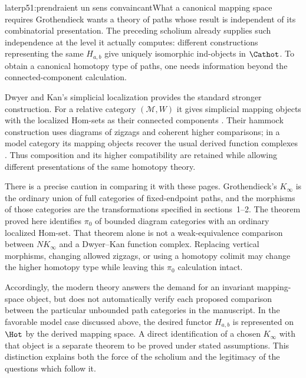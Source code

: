 \begin{dcomment}{later}{p51:prendraient un sens convaincant}{What a canonical mapping space requires}
Grothendieck wants a theory of paths whose result is independent of its combinatorial presentation. The preceding scholium already supplies such independence at the level it actually computes: different constructions representing the same $H_{a,b}$ give uniquely isomorphic ind-objects in $\Cathot$. To obtain a canonical homotopy type of paths, one needs information beyond the connected-component calculation.

Dwyer and Kan's simplicial localization provides the standard stronger construction. For a relative category $(\mathcal M,W)$ it gives simplicial mapping objects with the localized Hom-sets as their connected components \citep[\S2 and Proposition~3.1]{DwyerKan1980Calculating}. Their hammock construction uses diagrams of zigzags and coherent higher comparisons; in a model category its mapping objects recover the usual derived function complexes \citep[Proposition~4.4 and Corollary~4.7]{DwyerKan1980Function}. Thus composition and its higher compatibility are retained while allowing different presentations of the same homotopy theory.

There is a precise caution in comparing it with these pages. Grothendieck's $K_\infty$ is the ordinary union of full categories of fixed-endpoint paths, and the morphisms of those categories are the transformations specified in sections~1--2. The theorem proved here identifies $\pi_0$ of bounded diagram categories with an ordinary localized Hom-set. That theorem alone is not a weak-equivalence comparison between $NK_\infty$ and a Dwyer--Kan function complex. Replacing vertical morphisms, changing allowed zigzags, or using a homotopy colimit may change the higher homotopy type while leaving this $\pi_0$ calculation intact.

Accordingly, the modern theory answers the demand for an invariant mapping-space object, but does not automatically verify each proposed comparison between the particular unbounded path categories in the manuscript. In the favorable model case discussed above, the desired functor $H_{a,b}$ is represented on $\Hot$ by the derived mapping space. A direct identification of a chosen $K_\infty$ with that object is a separate theorem to be proved under stated assumptions. This distinction explains both the force of the scholium and the legitimacy of the questions which follow it.
\end{dcomment}

